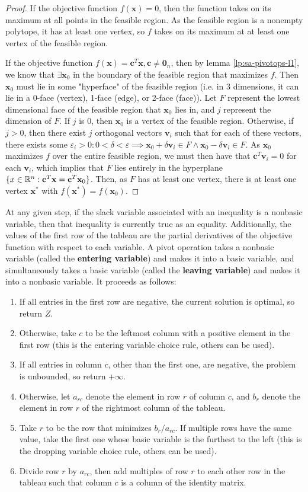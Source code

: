 \documentclass[10pt]{article}
\renewcommand{\vec}[1]{\mathbf{#1}}
\newcommand{\R}[1][]{ \ifx&#1& \mathbb{R} \else \mathbb{R}^{#1} \fi }
\newcommand{\x}{\vec{x}}
\newcommand{\vz}[1]{\vec{0}_{#1}}
\renewcommand{\c}{\vec{c}}
\begin{document}
\begin{proof}
	\label{lp:sa-pivotops-t1}
	If the objective function $f(\x) = 0$, then the function takes on its maximum at all points in the feasible region. As the feasible region is a nonempty polytope, it has at least one vertex, so $f$ takes on its maximum at at least one vertex of the feasible region.
	
	If the objective function $f(\x) = \c^T\x, \c\neq\vz{n}$, then by lemma \ref{lp:sa-pivotops-l1}, we know that $\exists\x_0$ in the boundary of the feasible region that maximizes $f$. Then $\x_0$ must lie in some "hyperface" of the feasible region (i.e. in 3 dimensions, it can lie in a 0-face (vertex), 1-face (edge), or 2-face (face)). Let $F$ represent the lowest dimensional face of the feasible region that $\x_0$ lies in, and $j$ represent the dimension of $F$. If $j$ is 0, then $\x_0$ is a vertex of the feasible region. Otherwise, if $j>0$, then there exist $j$ orthogonal vectors $\vec{v}_i$ such that for each of these vectors, there exists some $\varepsilon_i>0: 0<\delta<\varepsilon\implies \x_0 + \delta\vec{v}_i\in F\land\x_0 - \delta\vec{v}_i\in F$. As $\x_0$ maximizes $f$ over the entire feasible region, we must then have that $\c^T\vec{v}_i = 0$ for each $\vec{v}_i$, which implies that $F$ lies entirely in the hyperplane $\{x\in\R[n]:\c^T\x=\c^T\x_0\}$. Then, as $F$ has at least one vertex, there is at least one vertex $\x^*$ with $f(\x^*)=f(\x_0)$.
\end{proof}
At any given step, if the slack variable associated with an inequality is a nonbasic variable, then that inequality is currently true as an equality. Additionally, the values of the first row of the tableau are the partial derivatives of the objective function with respect to each variable. A pivot operation takes a nonbasic variable (called the \textbf{entering variable}) and makes it into a basic variable, and simultaneously takes a basic variable (called the \textbf{leaving variable}) and makes it into a nonbasic variable. It proceeds as follows:
\begin{enumerate}
	\item If all entries in the first row are negative, the current solution is optimal, so return $Z$.
	\item Otherwise, take $c$ to be the leftmost column with a positive element in the first row \cite{bland} (this is the entering variable choice rule, others can be used).
	\item If all entries in column $c$, other than the first one, are negative, the problem is unbounded, so return $+\infty$.
	\item Otherwise, let $a_{rc}$ denote the element in row $r$ of column $c$, and $b_r$ denote the element in row $r$ of the rightmost column of the tableau.
	\item Take $r$ to be the row that minimizes $b_r/a_{rc}$. If multiple rows have the same value, take the first one whose basic variable is the furthest to the left \cite{bland} (this is the dropping variable choice rule, others can be used).
	\item Divide row $r$ by $a_{rc}$, then add multiples of row $r$ to each other row in the tableau such that column $c$ is a column of the identity matrix.
\end{enumerate}
\end{document}
